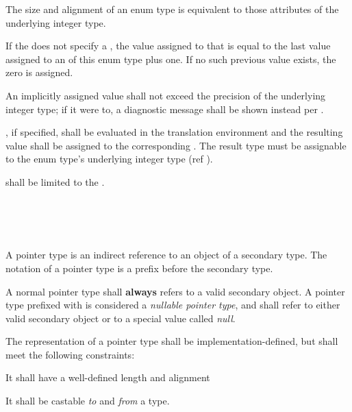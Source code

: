 \specsubsubitem
The size and alignment of an enum type is equivalent to those attributes of the
underlying integer type.

\specsubsubitem
If the  does not specify a
, the value assigned to that 
is equal to the last value assigned to an  of this enum
type plus one. If no such previous value exists, the zero is assigned.

\specsubsubitem
An implicitly assigned value shall not exceed the precision of the underlying
integer type; if it were to, a diagnostic message shall be shown instead per
.

\specsubsubitem
{}, if specified, shall be evaluated in the
translation environment and the resulting value shall be assigned to the
corresponding . The result type must be assignable to
the enum type's underlying integer type (ref ).

\specsubsubitem
{} shall be limited to the
.


\begin{grammar}
 \\
	\terminal{*}  \\
	 \terminal{*}  \\
\end{grammar}

\specsubsubitem
A pointer type is an indirect reference to an object of a secondary type. The
notation of a pointer type is a \terminal{*} prefix before the secondary type.

\specsubsubitem
A normal pointer type shall \textbf{always} refers to a valid secondary object.
A pointer type prefixed with  is considered a
\textit{nullable pointer type}, and shall refer to either valid secondary object
or to a special value called \textit{null}.

\specsubsubitem
The representation of a pointer type shall be implementation-defined, but shall
meet the following constraints:

\begin{subsubitemize}
\item It shall have a well-defined length and alignment
\item It shall be castable \textit{to} and \textit{from} a  type.
\end{subsubitemize}






